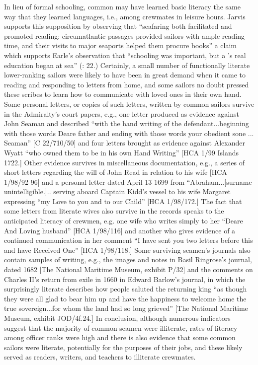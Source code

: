   In lieu of formal schooling, common  may have learned basic literacy the same way that they learned languages, i.e., among crewmates in leisure hours. Jarvis supports this supposition by observing that “seafaring both facilitated and promoted reading: circumatlantic passages provided sailors with ample reading time, and their visits to major seaports helped them procure books” \citep[307,]{Jarvis2010} a claim which supports Earle’s observation that “schooling was important, but a ’s real education began at sea” (\citeyear*{Earle1998}: 22.) Certainly, a small number of functionally literate lower-ranking sailors were likely to have been in great demand when it came to reading and responding to letters from home, and some sailors no doubt pressed these scribes to learn how to communicate with loved ones in their own hand. Some personal letters, or copies of such letters, written by common sailors survive in the Admiralty’s court papers, e.g., one letter produced as evidence against John Seaman and described “with the hand writing of the defendant...beginning with those words Deare father and ending with those words your obedient sone ... Seaman” [C 22/710/50] and four letters brought as evidence against Alexander Wyatt “who owned them to be in his own Hand Writing” [HCA 1/99  Islands 1722.] Other evidence survives in miscellaneous documentation, e.g., a series of short letters regarding the will of John Read in relation to his wife [HCA 1/98/92-96] and a personal letter dated April 13 1699 from “Abraham...[surname unintelligible.].. serving aboard Captain Kidd’s vessel to his wife Margaret expressing “my Love to you and to our Child” [HCA 1/98/172.] The fact that some letters from literate wives also survive in the records speaks to the anticipated literacy of crewmen, e.g. one wife who writes simply to her “Deare And Loving husband” [HCA 1/98/116] and another who gives evidence of a continued communication in her comment “I have sent you two letters before this and have Received One” [HCA 1/98/118.] Some surviving seamen’s journals also contain samples of writing, e.g., the images and notes in Basil Ringrose’s journal, dated 1682 [The National Maritime Museum, exhibit P/32] and the comments on Charles II’s return from exile in 1660 in Edward Barlow’s journal, in which the surprisingly literate  describes how people saluted the returning king “as though they were all glad to bear him up and have the happiness to welcome home the true sovereign...for whom the land had so long grieved” [The National Maritime Museum, exhibit JOD/4f.24.] In conclusion, although numerous indicators suggest that the majority of common seamen were illiterate, rates of literacy among officer ranks were high and there is also evidence that some common sailors were literate, potentially for the purposes of their jobs, and these likely served as readers, writers, and teachers to illiterate crewmates. 

